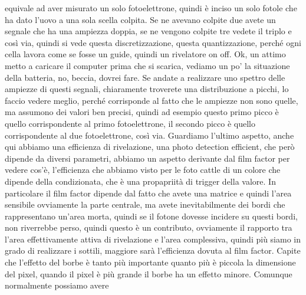 equivale ad aver misurato un solo fotoelettrone, quindi è inciso un solo fotole che ha dato l'uovo a una sola scella colpita. Se ne avevano colpite due avete un segnale che ha una ampiezza doppia, se ne vengono colpite tre vedete il triplo e così via, quindi si vede questa discretizzazione, questa quantizzazione, perché ogni cella lavora come se fosse un guide, quindi un rivelatore on off. Ok, un attimo metto a caricare il computer prima che si scarica, vediamo un po' la situazione della batteria, no, beccia, dovrei fare. Se andate a realizzare uno spettro delle ampiezze di questi segnali, chiaramente troverete una distribuzione a picchi, lo faccio vedere meglio, perché corrisponde al fatto che le ampiezze non sono quelle, ma assumono dei valori ben precisi, quindi ad esempio questo primo picco è quello corrispondente al primo fotoelettrone, il secondo picco è quello corrispondente al due fotoelettrone, così via. Guardiamo l'ultimo aspetto, anche qui abbiamo una efficienza di rivelazione, una photo detection efficient, che però dipende da diversi parametri, abbiamo un aspetto derivante dal film factor per vedere cos'è, l'efficienza che abbiamo visto per le foto cattle di un colore che dipende della condizionata, che è una propapriità di trigger della valore. In particolare il film factor dipende dal fatto che avete una matrice e quindi l'area sensibile ovviamente la parte centrale, ma avete inevitabilmente dei bordi che rappresentano un'area morta, quindi se il fotone dovesse incidere su questi bordi, non riverrebbe perso, quindi questo è un contributo, ovviamente il rapporto tra l'area effettivamente attiva di rivelazione e l'area complessiva, quindi più siamo in grado di realizzare i sottili, maggiore sarà l'efficienza dovuta al film factor. Capite che l'effetto del borbe è tanto più importante quanto più è piccola la dimensione del pixel, quando il pixel è più grande il borbe ha un effetto minore. Comunque normalmente possiamo avere

